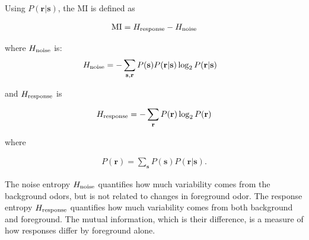 \documentclass[9pt,lineno]{elife}
\begin{document}
Using $P(\mathbf r| \mathbf s)$, the MI is defined as

\begin{align*}
\textup{MI} = H_{\textup{response}} - H_{\textup{noise}}
\end{align*}

where $H_{\textup{noise}}$ is:
\begin{align*}
H_{\textup{noise}} &= -\sum_{\mathbf s, \mathbf r} P(\mathbf s) 
                P(\mathbf r| \mathbf s) \log_2 P(\mathbf r| \mathbf s) 
\end{align*}

and $H_{\textup{response}}$ is

\begin{align*}
H_{\textup{response}} = -\sum_{\mathbf r} P(\mathbf r) \log_2 P(\mathbf r)
\end{align*}

where

\begin{align*}
P(\mathbf r) = \sum_{\mathbf s} P(\mathbf s) P(\mathbf r| \mathbf s).
\end{align*}

The noise entropy $H_{\textup{noise}}$ quantifies how much variability comes from the background odors, but is not related to changes in foreground odor. The response entropy $H_{\textup{response}}$ quantifies how much variability comes from both background and foreground. The mutual information, which is their difference, is a measure of how responses differ by foreground alone.


\end{document}
